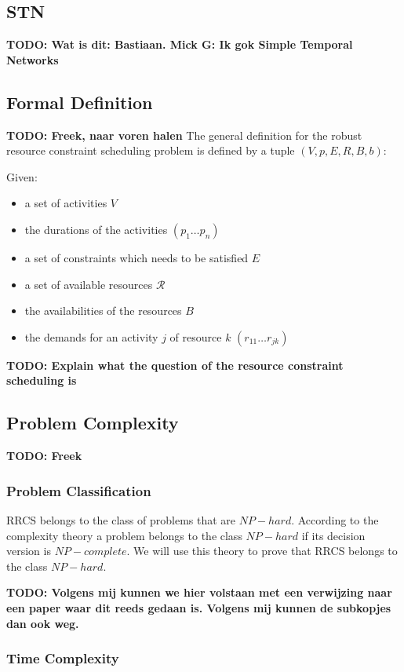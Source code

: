 \documentclass{article}
\newcommand{\TODO}[1]{{\color{red}\textbf{TODO: #1}}}
\begin{document}
\subsection{STN}
\TODO{Wat is dit: Bastiaan.
Mick G: Ik gok Simple Temporal Networks}

\subsection{Formal Definition}
\TODO{Freek, naar voren halen}
The general definition for the robust resource constraint scheduling problem is defined by a tuple $(V, p, E,R,B, b)$:\\

\cite{brucker99}

Given:
\begin{itemize}
\item a set of activities $V$
\item the durations of the activities $(p_1\ldots p_n)$
\item a set of constraints which needs to be satisfied $E$
\item a set of available resources $\mathcal{R}$
\item the availabilities of the resources $B$
\item the demands for an activity $j$ of resource $k$ $(r_{11}\ldots r_{jk})$
\end{itemize}

\TODO{Explain what the question of the resource constraint scheduling is}

\subsection{Problem Complexity}
\TODO{Freek}
\subsubsection{Problem Classification}
RRCS belongs to the class of problems that are $NP-hard$. According to the complexity theory a problem belongs to the class $NP-hard$ if its decision version is $NP-complete$. We will use this theory to prove that RRCS belongs to the class $NP-hard$.

\TODO{Volgens mij kunnen we hier volstaan met een verwijzing naar een paper waar dit reeds gedaan is. Volgens mij kunnen de subkopjes dan ook weg.}
\subsubsection{Time Complexity}
\end{document}
